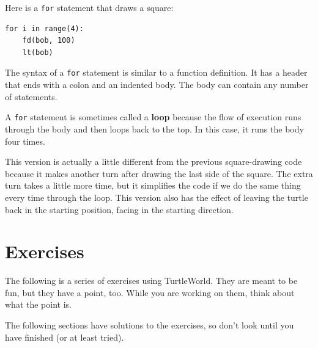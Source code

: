 \documentclass[10pt]{book}
\begin{document}
Here is a {\tt for} statement that draws a square:

\begin{verbatim}
for i in range(4):
    fd(bob, 100)
    lt(bob)
\end{verbatim}
%
The syntax of a {\tt for} statement is similar to a function
definition.  It has a header that ends with a colon and an indented
body.  The body can contain any number of statements.

A {\tt for} statement is sometimes called a {\bf loop} because
the flow of execution runs through the body and then loops back
to the top.  In this case, it runs the body four times.

This version is actually a little different from the previous
square-drawing code because it makes another turn after
drawing the last side of the square.  The extra turn takes a little
more time, but it simplifies the code if we do the same thing
every time through the loop.  This version also has the effect
of leaving the turtle back in the starting position, facing in
the starting direction.

\section{Exercises}

The following is a series of exercises using TurtleWorld.  They
are meant to be fun, but they have a point, too.  While you are
working on them, think about what the point is.

The following sections have solutions to the exercises, so
don't look until you have finished (or at least tried).
\end{document}

